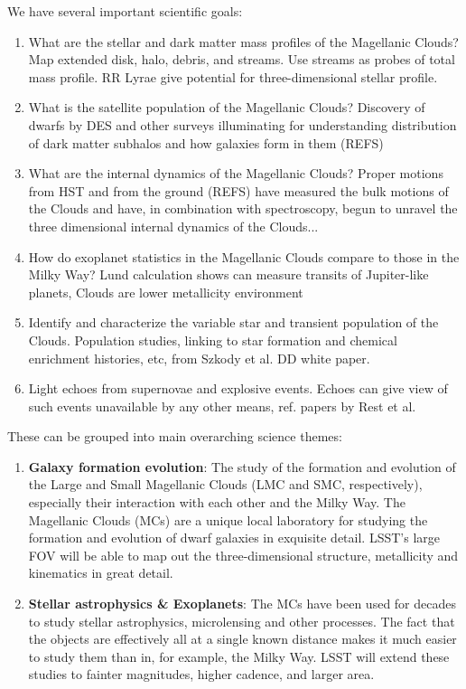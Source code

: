We have several important scientific goals:
\begin{enumerate}

\item What are the stellar and dark matter mass profiles of the
Magellanic Clouds?  Map extended disk, halo, debris, and streams.  Use
streams as probes of total mass profile.  RR Lyrae give potential for
three-dimensional stellar profile.

\item What is the satellite population of the Magellanic Clouds?
Discovery of dwarfs by DES and other surveys illuminating for
understanding distribution of dark matter subhalos and how galaxies
form in them (REFS)

\item What are the internal dynamics of the Magellanic Clouds?  Proper
motions from HST and from the ground (REFS) have measured the bulk
motions of the Clouds and have, in combination with spectroscopy,
begun to unravel the three dimensional internal dynamics of the
Clouds...

\item How do exoplanet statistics in the Magellanic Clouds compare to
those in the Milky Way?  Lund calculation shows can measure transits
of Jupiter-like planets, Clouds are lower metallicity environment

\item Identify and characterize the variable star and transient
population of the Clouds.  Population studies, linking to star
formation and chemical enrichment histories, etc, from Szkody et al.
DD white paper.

\item Light echoes from supernovae and explosive events.  Echoes can
give view of such events unavailable by any other means, ref. papers
by Rest et al.

\end{enumerate}

These can be grouped into main overarching science themes:
\begin{enumerate}
\item {\bf Galaxy formation evolution}: The study of the formation and
evolution of the Large and Small Magellanic Clouds (LMC and SMC,
respectively), especially their interaction with each other and the
Milky Way. The Magellanic Clouds (MCs) are a unique local laboratory
for studying the formation and evolution of dwarf galaxies in
exquisite detail.  LSST's large FOV will be able to map out the
three-dimensional structure, metallicity and kinematics in great
detail.
\item {\bf Stellar astrophysics \& Exoplanets}:  The MCs have been
used for decades to study stellar astrophysics, microlensing and other
processes.  The fact that the objects are effectively all at a single
known distance makes it much easier to study them than in, for
example, the Milky Way.  LSST will extend these studies to fainter
magnitudes, higher cadence, and larger area.
\end{enumerate}

